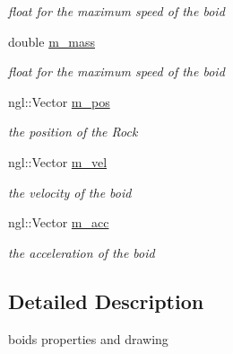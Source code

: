 \begin{DoxyCompactItemize}
\begin{DoxyCompactList}\small\item\em float for the maximum speed of the boid \end{DoxyCompactList}\item 
\hypertarget{classBoid_ab00080b05849af3a93796d8a37e38897}{
double \hyperlink{classBoid_ab00080b05849af3a93796d8a37e38897}{m\_\-mass}}
\label{classBoid_ab00080b05849af3a93796d8a37e38897}

\begin{DoxyCompactList}\small\item\em float for the maximum speed of the boid \end{DoxyCompactList}\item 
\hypertarget{classBoid_aadcf9cea504eb83c47a986a40803253c}{
ngl::Vector \hyperlink{classBoid_aadcf9cea504eb83c47a986a40803253c}{m\_\-pos}}
\label{classBoid_aadcf9cea504eb83c47a986a40803253c}

\begin{DoxyCompactList}\small\item\em the position of the Rock \end{DoxyCompactList}\item 
\hypertarget{classBoid_a3107e1d62f285edd11944bf1edf57f3f}{
ngl::Vector \hyperlink{classBoid_a3107e1d62f285edd11944bf1edf57f3f}{m\_\-vel}}
\label{classBoid_a3107e1d62f285edd11944bf1edf57f3f}

\begin{DoxyCompactList}\small\item\em the velocity of the boid \end{DoxyCompactList}\item 
\hypertarget{classBoid_a7afed4c0a8d95c811e8bdf58dc82912e}{
ngl::Vector \hyperlink{classBoid_a7afed4c0a8d95c811e8bdf58dc82912e}{m\_\-acc}}
\label{classBoid_a7afed4c0a8d95c811e8bdf58dc82912e}

\begin{DoxyCompactList}\small\item\em the acceleration of the boid \end{DoxyCompactList}\end{DoxyCompactItemize}


\subsection{Detailed Description}
boids properties and drawing 

